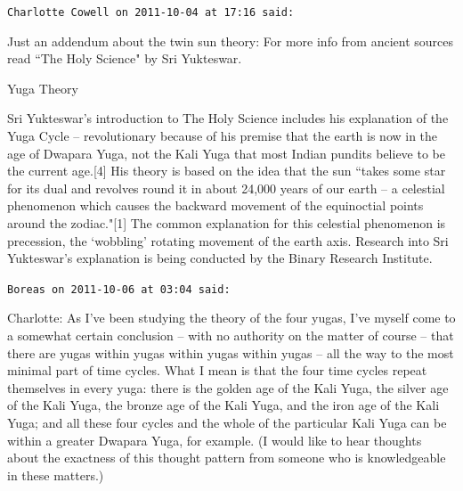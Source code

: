 \begin{footnotesize}
\begin{sffamily}
\hfill

\texttt{Charlotte Cowell on 2011-10-04 at 17:16 said: }

Just an addendum about the twin sun theory: For more info from ancient sources read ``The Holy Science" by Sri Yukteswar.

Yuga Theory

Sri Yukteswar's introduction to The Holy Science includes his explanation of the Yuga Cycle – revolutionary because of his premise that the earth is now in the age of Dwapara Yuga, not the Kali Yuga that most Indian pundits believe to be the current age.[4] His theory is based on the idea that the sun ``takes some star for its dual and revolves round it in about 24,000 years of our earth – a celestial phenomenon which causes the backward movement of the equinoctial points around the zodiac."[1] The common explanation for this celestial phenomenon is precession, the `wobbling' rotating movement of the earth axis. Research into Sri Yukteswar's explanation is being conducted by the Binary Research Institute.


\hfill

\texttt{Boreas on 2011-10-06 at 03:04 said: }

Charlotte: As I've been studying the theory of the four yugas, I've myself come to a somewhat certain conclusion – with no authority on the matter of course – that there are yugas within yugas within yugas within yugas – all the way to the most minimal part of time cycles. What I mean is that the four time cycles repeat themselves in every yuga: there is the golden age of the Kali Yuga, the silver age of the Kali Yuga, the bronze age of the Kali Yuga, and the iron age of the Kali Yuga; and all these four cycles and the whole of the particular Kali Yuga can be within a greater Dwapara Yuga, for example. (I would like to hear thoughts about the exactness of this thought pattern from someone who is knowledgeable in these matters.)


\hfill


\end{sffamily}\end{footnotesize}
